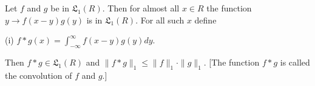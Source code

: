 Let $f$ and $g$ be in $\mathfrak{L}_1(R)$. Then for almost all $x \in R$ the function $y \rightarrow f(x - y)g(y)$ is in $\mathfrak{L}_1(R)$. For all such $x$ define

(i) $f * g(x) = \int_{-\infty}^{\infty} f(x - y)g(y) dy$.

Then $f * g \in \mathfrak{L}_1(R)$ and $\|f * g\|_1 \leq \|f\|_1 \cdot \|g\|_1$. [The function $f * g$ is called the convolution of $f$ and $g$.]